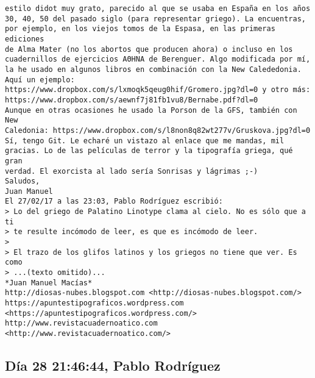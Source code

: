 \documentclass[a4paper,10pt]{article}
\begin{document}
\begin{lstlisting}
estilo didot muy grato, parecido al que se usaba en España en los años
30, 40, 50 del pasado siglo (para representar griego). La encuentras,
por ejemplo, en los viejos tomos de la Espasa, en las primeras ediciones
de Alma Mater (no los abortos que producen ahora) o incluso en los
cuadernillos de ejercicios AΘΗΝΑ de Berenguer. Algo modificada por mí,
la he usado en algunos libros en combinación con la New Calededonia.
Aquí un ejemplo:
https://www.dropbox.com/s/lxmoqk5qeug0hif/Gromero.jpg?dl=0 y otro más:
https://www.dropbox.com/s/aewnf7j81fb1vu8/Bernabe.pdf?dl=0
Aunque en otras ocasiones he usado la Porson de la GFS, también con New
Caledonia: https://www.dropbox.com/s/l8non8q82wt277v/Gruskova.jpg?dl=0
Sí, tengo Git. Le echaré un vistazo al enlace que me mandas, mil
gracias. Lo de las películas de terror y la tipografía griega, qué gran
verdad. El exorcista al lado sería Sonrisas y lágrimas ;-)
Saludos,
Juan Manuel
El 27/02/17 a las 23:03, Pablo Rodríguez escribió:
> Lo del griego de Palatino Linotype clama al cielo. No es sólo que a ti
> te resulte incómodo de leer, es que es incómodo de leer.
>
> El trazo de los glifos latinos y los griegos no tiene que ver. Es como
> ...(texto omitido)...
*Juan Manuel Macías*
http://diosas-nubes.blogspot.com <http://diosas-nubes.blogspot.com/>
https://apuntestipograficos.wordpress.com
<https://apuntestipograficos.wordpress.com/>
http://www.revistacuadernoatico.com <http://www.revistacuadernoatico.com/>

\end{lstlisting}

\subsection{Día 28 21:46:44, Pablo Rodríguez}
\end{document}
